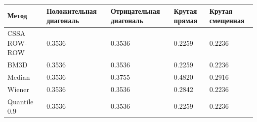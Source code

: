 \begin{tabular}{|l|l|l|l|l|}
\hline
Метод & Положительная диагональ & Отрицательная диагональ & Крутая прямая & Крутая смещенная \\
\hline
CSSA ROW-ROW & 0.3536 & 0.3536 & 0.2259 & 0.2236 \\
\hline
BM3D & 0.3536 & 0.3536 & 0.2259 & 0.2236 \\
\hline
Median & 0.3536 & 0.3755 & 0.4820 & 0.2916 \\
\hline
Wiener & 0.3536 & 0.3536 & 0.2842 & 0.2236 \\
\hline
Quantile 0.9 & 0.3536 & 0.3536 & 0.2259 & 0.2236 \\
\hline
\end{tabular}
